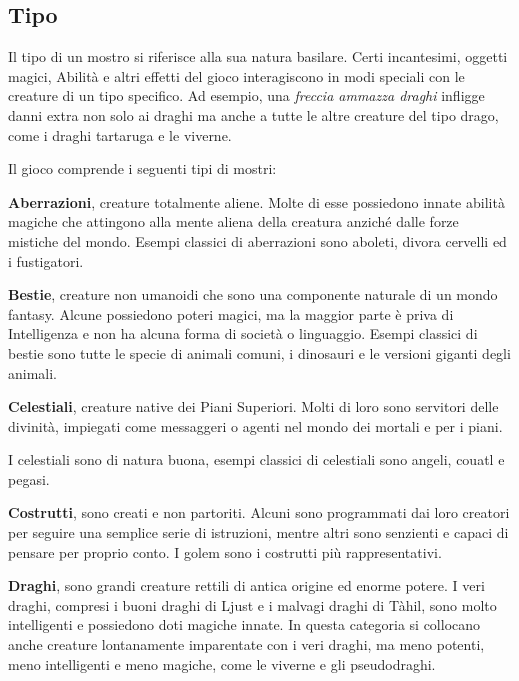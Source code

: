 \begin{multicols}{2}

\subsection{Tipo}

Il tipo di un mostro si riferisce alla sua natura basilare. Certi incantesimi, oggetti magici, Abilità e altri effetti del gioco interagiscono in modi speciali con le creature di un tipo specifico. Ad esempio, una \emph{freccia ammazza draghi} infligge danni extra non solo ai draghi ma anche a tutte le altre creature del tipo drago, come i draghi tartaruga e le viverne.

Il gioco comprende i seguenti tipi di mostri:

\smallskip\textbf{Aberrazioni}, creature totalmente aliene. Molte di esse possiedono innate abilità magiche che attingono alla mente aliena della creatura anziché dalle forze mistiche del mondo. Esempi classici di aberrazioni sono aboleti, divora cervelli ed i fustigatori.

\smallskip\textbf{Bestie}, creature non umanoidi che sono una componente naturale di un mondo fantasy. Alcune possiedono poteri magici, ma la maggior parte è priva di Intelligenza e non ha alcuna forma di società o linguaggio. Esempi classici di bestie sono tutte le specie di animali comuni, i dinosauri e le versioni giganti degli animali.

\smallskip\textbf{Celestiali}, creature native dei Piani Superiori. Molti di loro sono servitori delle divinità, impiegati come messaggeri o agenti nel mondo dei mortali e per i piani.

\medskip

I celestiali sono di natura buona, esempi classici di celestiali sono angeli, couatl e pegasi.

\smallskip\textbf{Costrutti}, sono creati e non partoriti. Alcuni sono programmati dai loro creatori per seguire una semplice serie di istruzioni, mentre altri sono senzienti e capaci di pensare per proprio conto. I golem sono i costrutti più rappresentativi.

\smallskip\textbf{Draghi}, sono grandi creature rettili di antica origine ed enorme potere. I veri draghi, compresi i buoni draghi di Ljust e i malvagi draghi di Tàhil, sono molto intelligenti e possiedono doti magiche innate. In questa categoria si collocano anche creature lontanamente imparentate con i veri draghi, ma meno potenti, meno intelligenti e meno magiche, come le viverne e gli pseudodraghi.


\end{multicols}
